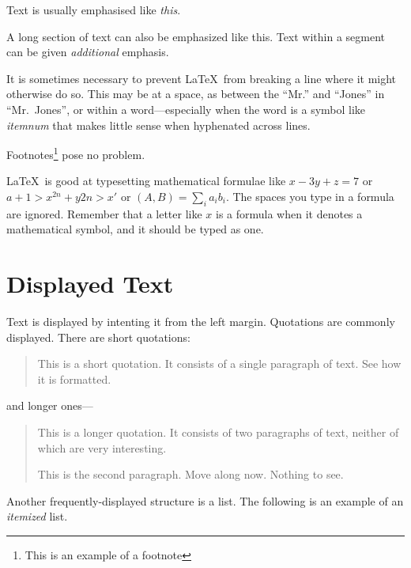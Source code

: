 \documentclass{article}
\newcommand{\ip}[2]{(#1, #2)}
\begin{document}
Text is usually emphasised like \emph{this}.
\begin{em}A long section of text can also be emphasized like this.  Text 
within a segment can be given \emph{additional} emphasis.
\end{em}

It is sometimes necessary to prevent \LaTeX\ from breaking a line where it
might otherwise do so.  This may be at a space, as between the ``Mr.'' and 
``Jones'' in ``Mr.~Jones'', %
or within a word---especially when the word is a symbol like
\mbox{\emph{itemnum}}
that makes little sense when hyphenated across lines.

Footnotes\footnote{This is an example of a footnote} pose no problem.

\LaTeX\ is good at typesetting mathematical formulae like
\( x-3y + z = 7 \) or 
\( a+{1} > x^{2n} + y{2n} > x' \) or
\( \ip{A}{B} = \sum_{i} a_{i} b_{i} \).  %
The spaces you type in a formula are ignored.  Remember that a letter like
$x$  %
is a formula when it denotes a mathematical symbol, and it should be typed
as one.

\section{Displayed Text}

Text is displayed by intenting it from the left margin.  Quotations are 
commonly displayed.  There are short quotations:
\begin{quote}
This is a short quotation.  It consists of a single paragraph of text.
See how it is formatted.
\end{quote}
and longer ones---
\begin{quotation}
This is a longer quotation.  It consists of two paragraphs of text, neither
of which are very interesting.

This is the second paragraph.  Move along now.  Nothing to see.
\end{quotation}

Another frequently-displayed structure is a list.  The following is an example
of an \emph{itemized} list.
\end{document}

